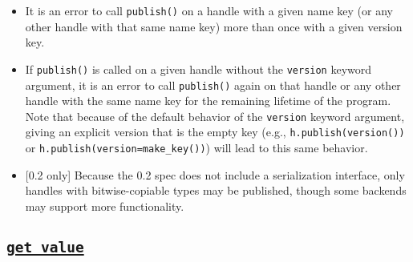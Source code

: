 \begin{subs}
\begin{itemize}
  have scheduling privileges of {\it Read} or {\it Modify}; calling publish on a
  handle with other scheduling permissions is a runtime error.  Also, as with
  all {\it read-only capture} operations, calling \texttt{publish()} on a
  handle with {\it Modify} immediate permissions results in a handle with {\it
  Read} immediate permissions in the continuing context.  See
  \S~\ref{sec:handlerules} for more details.  For example, the following code
  results in a runtime error at the marked line:
\begin{minipage}[t]{0.95\linewidth}%
  \centering
  \begin{CppCode}
  auto h = initial_access<int>("key");
  create_work([=]{
    h.set_value(5);
    h.publish();
    h.set_value(10); // $\no$ h has Read immediate permissions
  });
  \end{CppCode}
\end{minipage}
  \item It is an error to call \texttt{publish()} on a handle with a given
  name key (or any other handle with that same name key) more than once with
  a given version key.
  \item If \texttt{publish()} is called on a given handle without the
  \texttt{version} keyword argument, it is an error to call \texttt{publish()}
  again on that handle or any other handle with the same name key for the
  remaining lifetime of the program.  Note that because of the default behavior
  of the \texttt{version} keyword argument, giving an explicit version that is
  the empty key (e.g., \texttt{h.publish(version())} or
  \texttt{h.publish(version=make\_key())}) will lead to this same behavior.
  \item {\color{red} [0.2 only]} Because the 0.2 spec does not include a
  serialization interface, only handles with bitwise-copiable types may be
  published, though some backends may support more functionality.
\end{itemize}


\end{subs}




\clearpage
\subsection{\underline{\texttt{get\_value}}}

